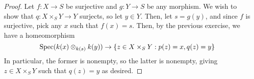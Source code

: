 \begin{proof}
	Let $f : X \to S$ be surjective and $g : Y \to S$ be any morphism. We wish to show that $q : X \times_S Y \to Y$ surjects, so let $y \in Y$. Then, let $s = g(y)$, and since $f$ is surjective, pick any $x$ such that $f(x) = s$. Then, by the previous exercise, we have a homeomorphism
	\[ \operatorname{Spec}(k(x) \otimes_{k(s)} k(y)) \to \{ z \in X \times_S Y : p(z) = x, q(z) = y \} \]
	In particular, the former is nonempty, so the latter is nonempty, giving $z \in X \times_S Y$ such that $q(z) = y$ as desired.
\end{proof}
